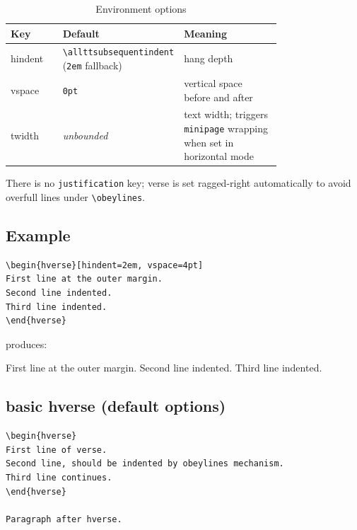 \documentclass[11pt, twoside, openany]{article}
\newcommand{\opt}[1]{\texttt{#1}}
\newcommand{\env}[1]{\texttt{#1}}
\newcommand{\cs}[1]{\texttt{\textbackslash #1}}
\begin{document}
\begin{table}[h]
    \centering
    \begin{tabular}{@{}>{\ttfamily}l >{\raggedright\arraybackslash}p{0.4\linewidth} p{0.36\linewidth}@{}}
      \toprule
  \normalfont \bfseries Key & \bfseries Default & \bfseries Meaning \\
  \midrule
  hindent & \cs{allttsubsequentindent} (\texttt{2em} fallback) & hang depth \\
  vspace  & \texttt{0pt}       & vertical space before and after \\
  twidth  & \textit{unbounded} & text width; triggers \env{minipage} wrapping when set in horizontal mode \\
  \bottomrule
\end{tabular}
    \caption{Environment options}
    \label{tab:environops2}
\end{table}

There is no \opt{justification} key; verse is set ragged-right automatically to avoid overfull lines under \cs{obeylines}.

\subsection*{Example}

\begin{verbatim}
\begin{hverse}[hindent=2em, vspace=4pt]
First line at the outer margin.
Second line indented.
Third line indented.
\end{hverse}
\end{verbatim}

\noindent produces:

\begin{hverse}[hindent=2em, vspace=4pt]
First line at the outer margin.
Second line indented.
Third line indented.
\end{hverse}

\subsection{basic hverse (default options)}

\begin{verbatim}
\begin{hverse}
First line of verse.
Second line, should be indented by obeylines mechanism.
Third line continues.
\end{hverse}

Paragraph after hverse.
\end{verbatim}
\end{document}
